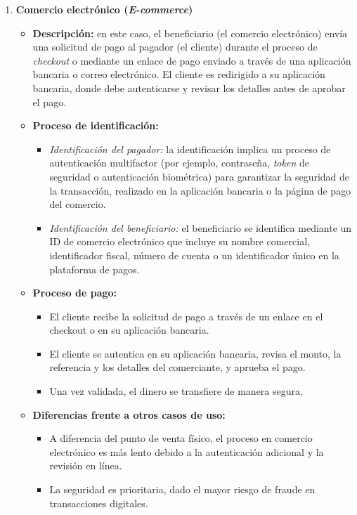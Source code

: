 \begin{enumerate}
    \item \textbf{Comercio electrónico (\textit{E-commerce})}
    \begin{itemize}
        \item \textbf{Descripción:} en este caso, el beneficiario (el comercio electrónico) envía una solicitud de pago al pagador (el cliente) durante el proceso de \textit{checkout} o mediante un enlace de pago enviado a través de una aplicación bancaria o correo electrónico. El cliente es redirigido a su aplicación bancaria, donde debe autenticarse y revisar los detalles antes de aprobar el pago.
        \item \textbf{Proceso de identificación:}
        \begin{itemize}
            \item \textit{Identificación del pagador:} la identificación implica un proceso de autenticación multifactor (por ejemplo, contraseña, \textit{token} de seguridad o autenticación biométrica) para garantizar la seguridad de la transacción, realizado en la aplicación bancaria o la página de pago del comercio.
            \item \textit{Identificación del beneficiario:} el beneficiario se identifica mediante un ID de comercio electrónico que incluye su nombre comercial, identificador fiscal, número de cuenta o un identificador único en la plataforma de pagos.
        \end{itemize}
        \item \textbf{Proceso de pago:}
        \begin{itemize}
            \item El cliente recibe la solicitud de pago a través de un enlace en el checkout o en su aplicación bancaria.
            \item El cliente se autentica en su aplicación bancaria, revisa el monto, la referencia y los detalles del comerciante, y aprueba el pago.
            \item Una vez validada, el dinero se transfiere de manera segura.
        \end{itemize}
        \item \textbf{Diferencias frente a otros casos de uso:}
        \begin{itemize}
            \item A diferencia del punto de venta físico, el proceso en comercio electrónico es más lento debido a la autenticación adicional y la revisión en línea.
            \item La seguridad es prioritaria, dado el mayor riesgo de fraude en transacciones digitales.
        \end{itemize}
    \end{itemize}


\end{enumerate}
